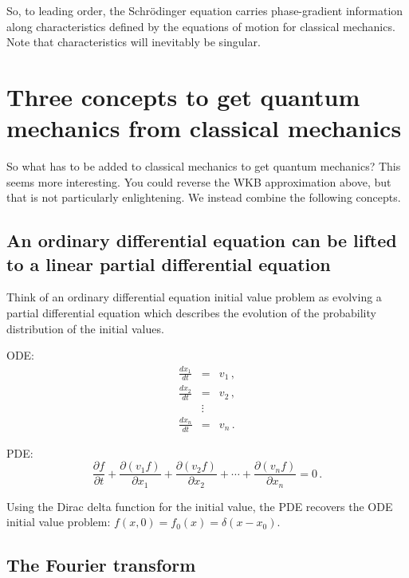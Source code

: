 \documentclass[prb,preprint]{revtex4-1}
\begin{document}
So, to leading order, the Schr\"odinger equation carries phase-gradient
information along characteristics defined by the equations of motion for classical mechanics.
Note that characteristics will inevitably be singular.


\section{Three concepts to get quantum mechanics from classical mechanics}

So what has to be added to classical mechanics to get quantum mechanics?  This seems more
interesting.  You could reverse the WKB approximation above, but that is not particularly
enlightening.  We instead combine the following concepts.

\subsection{An ordinary differential equation can be lifted to a linear partial differential equation}

Think of an ordinary differential equation initial value problem as evolving a
partial differential equation which describes the evolution of the probability
distribution of the initial values.\cite{goldstein2002}

ODE:
\begin{eqnarray}
\frac{dx_1}{dt} &=& v_1 \,, \\
\frac{dx_2}{dt} &=& v_2 \,, \\
&\vdots& \nonumber \\
\frac{dx_n}{dt} &=& v_n \,.
\end{eqnarray}

PDE:
\begin{equation}\label{eq:liouville}
\frac{\partial f}{\partial t}
+ \frac{\partial (v_1 f)}{\partial x_1}
+ \frac{\partial (v_2 f)}{\partial x_2}
+ \cdots
+ \frac{\partial (v_n f)}{\partial x_n}
= 0 \,.
\end{equation}

Using the Dirac delta function for the initial value, the PDE recovers the ODE initial value
problem: $f(x,0) = f_0(x) = \delta(x-x_0)$.

\subsection{The Fourier transform}
\end{document}
